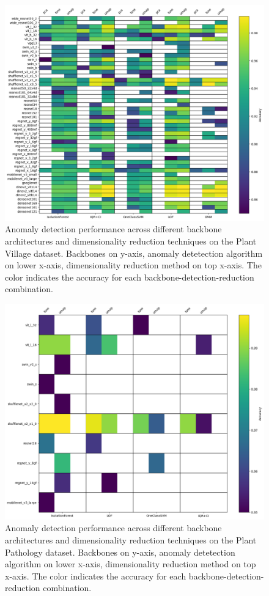 \documentclass[12pt,a4paper,oneside]{report}
\begin{document}
\begin{figure}[H]
    \centering
    \includegraphics[width=17cm]{plots/anomaly_detection_plantvillage}
    \caption{Anomaly detection performance across different backbone architectures and dimensionality reduction techniques on the Plant Village dataset.
    Backbones on y-axis, anomaly detetection algorithm on lower x-axis, dimensionality reduction method on top x-axis.
    The color indicates the accuracy for each backbone-detection-reduction combination.}
    \label{fig:anomaly_detection_plantvillage}
\end{figure}

\begin{figure}[H]
    \centering
    \includegraphics[width=17cm]{plots/anomaly_detection_plantpathology}
    \caption{Anomaly detection performance across different backbone architectures and dimensionality reduction techniques on the Plant Pathology dataset.
    Backbones on y-axis, anomaly detetection algorithm on lower x-axis, dimensionality reduction method on top x-axis.
    The color indicates the accuracy for each backbone-detection-reduction combination.}
    \label{fig:anomaly_detection_plantpathology}
\end{figure}
\end{document}
